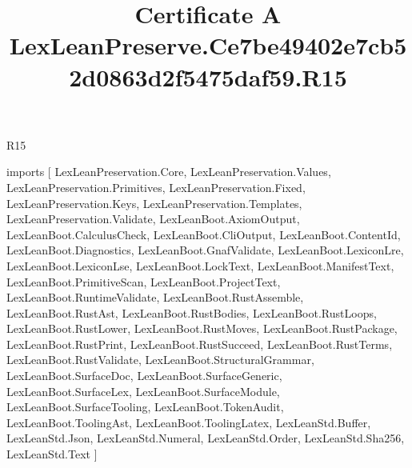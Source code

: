 \begin{lexlean}{R15}
\title{Certificate A LexLeanPreserve.Ce7be49402e7cb52d0863d2f5475daf59.R15}
\begin{coremodule}
imports [
  LexLeanPreservation.Core,
  LexLeanPreservation.Values,
  LexLeanPreservation.Primitives,
  LexLeanPreservation.Fixed,
  LexLeanPreservation.Keys,
  LexLeanPreservation.Templates,
  LexLeanPreservation.Validate,
  LexLeanBoot.AxiomOutput,
  LexLeanBoot.CalculusCheck,
  LexLeanBoot.CliOutput,
  LexLeanBoot.ContentId,
  LexLeanBoot.Diagnostics,
  LexLeanBoot.GnafValidate,
  LexLeanBoot.LexiconLre,
  LexLeanBoot.LexiconLse,
  LexLeanBoot.LockText,
  LexLeanBoot.ManifestText,
  LexLeanBoot.PrimitiveScan,
  LexLeanBoot.ProjectText,
  LexLeanBoot.RuntimeValidate,
  LexLeanBoot.RustAssemble,
  LexLeanBoot.RustAst,
  LexLeanBoot.RustBodies,
  LexLeanBoot.RustLoops,
  LexLeanBoot.RustLower,
  LexLeanBoot.RustMoves,
  LexLeanBoot.RustPackage,
  LexLeanBoot.RustPrint,
  LexLeanBoot.RustSucceed,
  LexLeanBoot.RustTerms,
  LexLeanBoot.RustValidate,
  LexLeanBoot.StructuralGrammar,
  LexLeanBoot.SurfaceDoc,
  LexLeanBoot.SurfaceGeneric,
  LexLeanBoot.SurfaceLex,
  LexLeanBoot.SurfaceModule,
  LexLeanBoot.SurfaceTooling,
  LexLeanBoot.TokenAudit,
  LexLeanBoot.ToolingAst,
  LexLeanBoot.ToolingLatex,
  LexLeanStd.Buffer,
  LexLeanStd.Json,
  LexLeanStd.Numeral,
  LexLeanStd.Order,
  LexLeanStd.Sha256,
  LexLeanStd.Text
]


\end{coremodule}
\end{lexlean}
